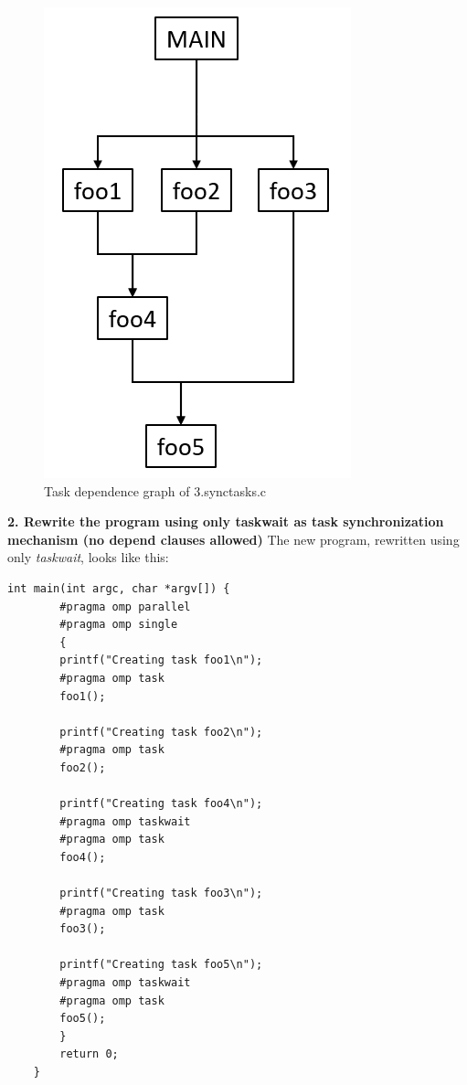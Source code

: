 \documentclass[12]{article}
\begin{document}
\begin{figure}[H]
\centering
\includegraphics[scale=0.5]{images/task_dependence_graph_synctasks.png}
\caption{Task dependence graph of 3.synctasks.c}
\label{task_dependence_graph_synctasks}
\end{figure}

\textbf{2. Rewrite the program using only taskwait as task synchronization mechanism (no depend clauses allowed)}
 The new program, rewritten using only \textit{taskwait}, looks like this:

 \begin{lstlisting}[frame=single]
    int main(int argc, char *argv[]) {
        #pragma omp parallel
        #pragma omp single
        {
        printf("Creating task foo1\n");
        #pragma omp task
        foo1();

        printf("Creating task foo2\n");
        #pragma omp task
        foo2();

        printf("Creating task foo4\n");
        #pragma omp taskwait
        #pragma omp task
        foo4();

        printf("Creating task foo3\n");
        #pragma omp task
        foo3();

        printf("Creating task foo5\n");
        #pragma omp taskwait
        #pragma omp task
        foo5();
        }
        return 0;
    }
\end{lstlisting}
\end{document}
